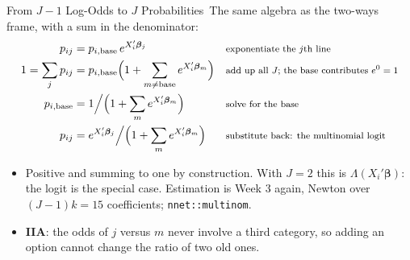 \documentclass[aspectratio=169,11pt,xcolor=dvipsnames]{beamer}
\newcommand{\core}{\,\raisebox{0.6pt}{\textcolor{corestar}{$\bigstar$}}}
\begin{document}
\begin{frame}{From $J - 1$ Log-Odds to $J$ Probabilities\core}
The same algebra as the two-ways frame, with a sum in the denominator:
\begingroup
\setlength{\abovedisplayskip}{2pt}\setlength{\belowdisplayskip}{2pt}
\begin{align*}
  p_{ij} &= p_{i,\text{base}}\, e^{X_i'\bm\beta_j}
    && \text{\footnotesize exponentiate the $j$th line} \\
  1 = \sum_j p_{ij} &= p_{i,\text{base}}\Big(1 + \sum_{m \ne \text{base}} e^{X_i'\bm\beta_m}\Big)
    && \text{\footnotesize add up all $J$; the base contributes $e^0 = 1$} \\
  p_{i,\text{base}} &= 1\Big/\Big(1 + \sum_{m} e^{X_i'\bm\beta_m}\Big)
    && \text{\footnotesize solve for the base} \\
  p_{ij} &= e^{X_i'\bm\beta_j}\Big/\Big(1 + \sum_{m} e^{X_i'\bm\beta_m}\Big)
    && \text{\footnotesize substitute back: the multinomial logit}
\end{align*}
\endgroup
\begin{itemize}\itemsep2pt
  \item Positive and summing to one by construction. With $J = 2$ this is
        $\Lambda(X_i'\bm\beta)$: the logit is the special case. Estimation
        is Week 3 again, Newton over $(J-1)k = 15$ coefficients;
        \texttt{nnet::multinom}.
  \item \textbf{IIA}: the odds of $j$ versus $m$ never involve a third
        category, so adding an option cannot change the ratio of two old
        ones.
\end{itemize}
\end{frame}
\end{document}
